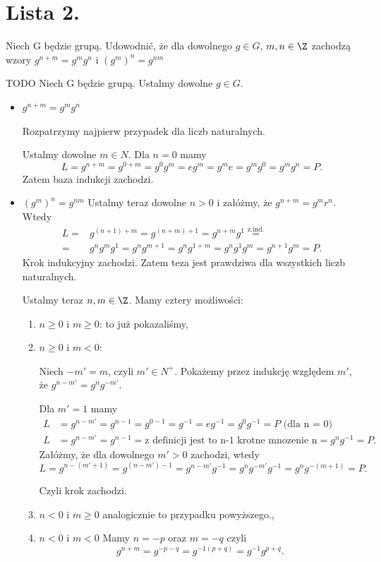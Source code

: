 \chapter{Lista 2.}
\begin{problem}[1]

	Niech G będzie grupą. Udowodnić, że dla dowolnego $g\in G$, $m,n \in \Z$ zachodzą wzory $g^{n+m} = g^{m}g^{n}$ i $\left( g^{m} \right)^{n} = g^{nm}$
\end{problem}
\begin{solution}
	TODO
	Niech G będzie grupą. Ustalmy dowolne $g\in G$.
\begin{itemize}
	\item $g^{n+m} = g^{m}g^{n}$ 

		Rozpatrzymy najpierw przypadek dla liczb naturalnych.

		Ustalmy dowolne $m \in N$.
		Dla $n=0$ mamy
		 \[
			 L = g^{n+m} = g^{0+m} = g^{0}g^{m} = eg^{m} = g^{m}e= g^{m}g^{0} = g^{m}g^{n} = P
		.\] 
		Zatem baza indukcji zachodzi.
	\item  $\left( g^{m} \right)^{n} = g^{nm}$
		Ustalmy teraz dowolne $n>0$ i załóżmy, że $g^{n+m} = g^{m}r^{n}$.
                Wtedy
		\begin{align*}
			L =& g^{(n+1) + m} = g^{(n+m) + 1} = g^{n+m}g^{1}  \overset{\text{z.ind.}}{=} \\ =& g^{n}g^{m}g^{1} = g^{n}g^{m+1} =g^{n}g^{1+m} = g^{n}g^{1}g^{m} = g^{n+1}g^{m} = P 
		.\end{align*}
		Krok indukcyjny zachodzi. Zatem  teza jest prawdziwa dla wszystkich liczb naturalnych.

		Ustalmy teraz $n,m\in \Z$. 
		Mamy cztery możliwości:
		\begin{enumerate}
			\item $n \ge 0$ i $m\ge 0$: to już pokazaliśmy,
			\item $n \ge 0$ i $m<0$:

				Niech $-m' = m$, czyli  $m' \in N^{+}$. Pokażemy przez indukcję względem $m'$, że  $g^{n-m'} = g^{n}g^{-m'}$.

				Dla $m' = 1$ mamy
				 \begin{align*}
					 L & = g^{n-m'} = g^{n-1} = g^{0-1} = g^{-1} = eg^{-1} = g^{0}g^{-1} = P \text{ (dla n = 0)} \\
					 L & = g^{n-m'} = g^{n-1} = \text{z definicji jest to n-1 krotne mnozenie n} = g^{n}g^{-1} = P 
				 .\end{align*}
				 Załóżmy, że dla dowolnego $m' > 0$ zachodzi, wtedy
				 \[
				 L = g^{n-(m'+1)} = g^{(n-m') - 1} = g^{n-m'}g^{-1}= g^{n}g^{-m'}g^{-1} = g^{n}g^{-(m+1)} = P
				 .\] 

				Czyli krok zachodzi.
		        \item $n<0$ i  $m\ge 0$ analogicznie to przypadku powyższego.,
			\item $n<0$ i  $m<0$ 
				Mamy $n = -p$ oraz $m = -q$
				czyli \[
				g ^{n+m} = g^{-p-q} = g^{-1(p+q)} = g^{-1}g^{p+q}
				.\] 
		\end{enumerate}

\end{itemize}
\end{solution}

